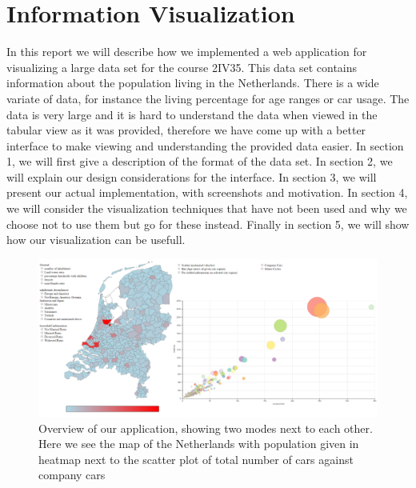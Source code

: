 \documentclass[a4paper,twoside,11pt]{article}
\begin{document}
\section*{Information Visualization}
In this report we will describe how we implemented a web application for visualizing a large data set for the course 2IV35. This data set contains information about the population living in the Netherlands.  \newline
There is a wide variate of data, for instance the living percentage for age ranges or car usage. The data is very large and it is hard to understand the data when viewed in the tabular view as it was provided, therefore we have come up with a better interface to make viewing and understanding the provided data easier. \newline
In section 1, we will first give a description of the format of the data set. \newline
In section 2, we will explain our design considerations for the interface. \newline
In section 3, we will present our actual implementation, with screenshots and motivation. \newline
In section 4, we will consider the visualization techniques that have not been used and why we choose not to use them but go for these instead. \newline
Finally in section 5, we will show how our visualization can be usefull. \newline
\newline
\newline
\newline
\newline
\newline
\begin{figure}[h]
  \begin{center}
    \includegraphics[width=1\textwidth]{FullScreen2}
  \end{center}
  \caption{Overview of our application, showing two modes next to each other. Here we see the map of the Netherlands with population given in heatmap next to the scatter plot of total number of cars against company cars}
\end{figure}
\newpage
\end{document}

